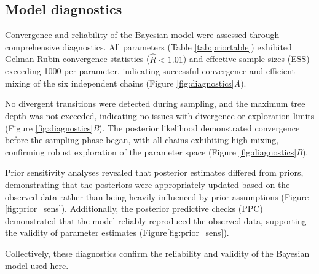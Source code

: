 \documentclass{article}
\begin{document}
\subsection{Model diagnostics}

Convergence and reliability of the Bayesian model were assessed through comprehensive diagnostics. All parameters (Table \ref{tab:priortable}) exhibited Gelman-Rubin convergence statistics ($\hat{R} < 1.01$) and effective
sample sizes (ESS) exceeding 1000 per parameter, indicating successful convergence and efficient mixing of
the six independent chains (Figure \ref{fig:diagnostics}\textit{A}). 


No divergent transitions were detected during sampling, and the maximum tree depth was not exceeded, indicating no issues with divergence or exploration limits (Figure \ref{fig:diagnostics}\textit{B}). The posterior likelihood demonstrated convergence before the sampling phase began, with all chains exhibiting high mixing, confirming robust exploration of the parameter space (Figure \ref{fig:diagnostics}\textit{B}).

Prior sensitivity analyses revealed that posterior estimates differed from priors, demonstrating that the posteriors were appropriately updated based on the observed data rather than being heavily influenced by prior assumptions (Figure \ref{fig:prior_sens}). Additionally, the posterior predictive checks (PPC) demonstrated that the model reliably reproduced the observed data, supporting the validity of parameter estimates (Figure\ref{fig:prior_sens}). 

Collectively, these diagnostics confirm the reliability and validity of the Bayesian model used here.
\end{document}
